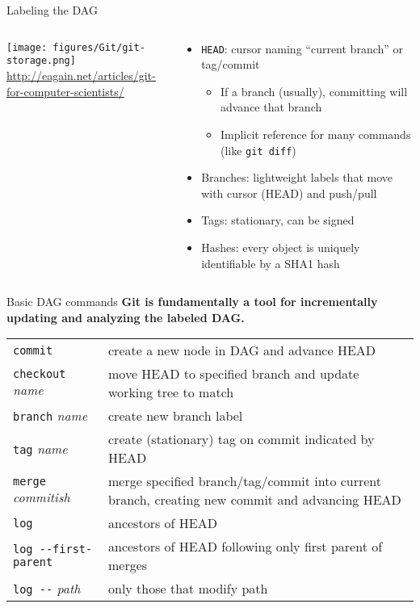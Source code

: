 \documentclass{beamer}
\begin{document}
\begin{frame}{Labeling the DAG}
  \begin{columns}
    \begin{column}{0.5\textwidth}
      \texttt{[image: figures/Git/git-storage.png]} \\
      {\tiny \url{http://eagain.net/articles/git-for-computer-scientists/}}
    \end{column}
    \begin{column}{0.5\textwidth}
      \begin{itemize}
      \item {\tt HEAD}: cursor naming ``current branch'' or tag/commit
        \begin{itemize}
        \item If a branch (usually), committing will advance that branch
        \item Implicit reference for many commands (like \texttt{git diff})
        \end{itemize}
      \item Branches: lightweight labels that move with cursor (HEAD) and push/pull
      \item Tags: stationary, can be signed
      \item Hashes: every object is uniquely identifiable by a SHA1 hash
      \end{itemize}
    \end{column}
  \end{columns}
\end{frame}

\begin{frame}{Basic DAG commands}
  \textbf{Git is fundamentally a tool for incrementally updating and analyzing the labeled DAG.}
  \begin{tabular}{l p{2.8in}}
    \toprule
    \texttt{commit} & create a new node in DAG and advance HEAD \\
    \texttt{checkout} \textit{name} & move HEAD to specified branch and update working tree to match \\
    \texttt{branch} \textit{name} & create new branch label \\
    \texttt{tag} \textit{name} & create (stationary) tag on commit indicated by HEAD \\
    \texttt{merge} \textit{commitish} & merge specified branch/tag/commit into current branch, creating new commit and advancing HEAD \\
    \midrule
    \texttt{log} & ancestors of HEAD \\
    \texttt{log -{}-first-parent} & ancestors of HEAD following only first parent of merges \\
    \texttt{log -{}-} \textit{path} & only those that modify path \\
    \bottomrule
  \end{tabular}
\end{frame}
\end{document}
